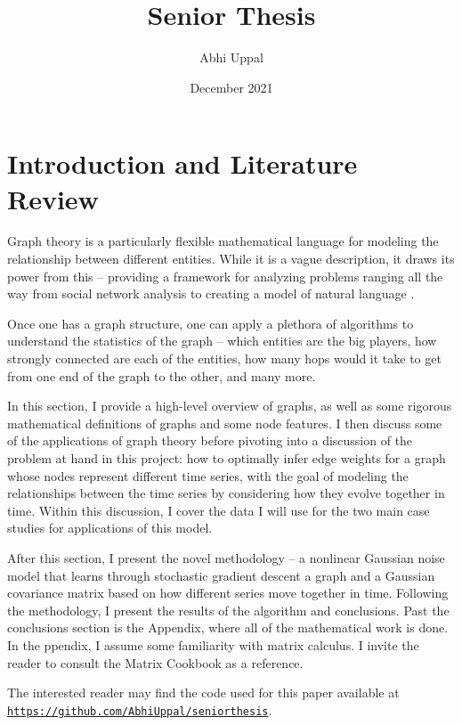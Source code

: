 \documentclass{article}
\title{Senior Thesis}
\author{Abhi Uppal}
\date{December 2021}
\theoremstyle{definition}
\begin{document}
\maketitle

\newpage

\section{Introduction and Literature Review}
\label{sec:intro}

Graph theory is a particularly flexible mathematical language for modeling the relationship between different entities. While it is a vague description, it draws its power from this -- providing a framework for analyzing problems ranging all the way from social network analysis \cite{socialNetworkAnalysis} to creating a model of natural language \cite{speer2018conceptnet}. 

Once one has a graph structure, one can apply a plethora of algorithms to understand the statistics of the graph -- which entities are the big players, how strongly connected are each of the entities, how many hops would it take to get from one end of the graph to the other, and many more. 

In this section, I provide a high-level overview of graphs, as well as some rigorous mathematical definitions of graphs and some node features. I then discuss some of the applications of graph theory before pivoting into a discussion of the problem at hand in this project: how to optimally infer edge weights for a graph whose nodes represent different time series, with the goal of modeling the relationships between the time series by considering how they evolve together in time. Within this discussion, I cover the data I will use for the two main case studies for applications of this model.

After this section, I present the novel methodology -- a nonlinear Gaussian noise model that learns through stochastic gradient descent a graph and a Gaussian covariance matrix based on how different series move together in time. Following the methodology, I present the results of the algorithm and conclusions. Past the conclusions section is the Appendix, where all of the mathematical work is done. In the ppendix, I assume some familiarity with matrix calculus. I invite the reader to consult the Matrix Cookbook \cite{matrixCookbook} as a reference.

The interested reader may find the code used for this paper available at \href{https://github.com/AbhiUppal/seniorthesis}{\texttt{https://github.com/AbhiUppal/seniorthesis}}.
\end{document}
